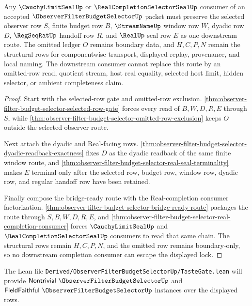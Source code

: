 \begin{theorem}
\label{thm:observer-filter-budget-selector-downstream-budget-lock}
Any $\CauchyLimitSealUp$ or $\RealCompletionSelectorSealUp$ consumer of an accepted $\ObserverFilterBudgetSelectorUp$ packet must preserve the selected observer row $S$, finite budget row $B$, $\StreamNameUp$ window row $W$, dyadic row $D$, $\RegSeqRatUp$ handoff row $R$, and $\RealUp$ seal row $E$ as one downstream route. The omitted ledger $O$ remains boundary data, and $H,C,P,N$ remain the structural rows for componentwise transport, displayed replay, provenance, and local naming. The downstream consumer cannot replace this route by an omitted-row read, quotient stream, host real equality, selected host limit, hidden selector, or ambient completeness claim.
\end{theorem}
\begin{proof}
Start with the selected-row gate and omitted-row exclusion. \autoref{thm:observer-filter-budget-selector-selected-row-gate} forces every read of $B,W,D,R,E$ through $S$, while \autoref{thm:observer-filter-budget-selector-omitted-row-exclusion} keeps $O$ outside the selected observer route.

Next attach the dyadic and Real-facing rows. \autoref{thm:observer-filter-budget-selector-dyadic-readback-exactness} fixes $D$ as the dyadic readback of the same finite window route, and \autoref{thm:observer-filter-budget-selector-real-seal-terminality} makes $E$ terminal only after the selected row, budget row, window row, dyadic row, and regular handoff row have been retained.

Finally compose the bridge-ready route with the Real-completion consumer factorization. \autoref{thm:observer-filter-budget-selector-bridge-ready-route} packages the route through $S,B,W,D,R,E$, and \autoref{thm:observer-filter-budget-selector-real-completion-consumer} forces $\CauchyLimitSealUp$ and $\RealCompletionSelectorSealUp$ consumers to read that same chain. The structural rows remain $H,C,P,N$, and the omitted row remains boundary-only, so no downstream completion consumer can escape the displayed lock.
\end{proof}

The Lean file \texttt{Derived/ObserverFilterBudgetSelectorUp/TasteGate.lean} will provide $\mathsf{Nontrivial}\ \ObserverFilterBudgetSelectorUp$ and $\mathsf{FieldFaithful}\ \ObserverFilterBudgetSelectorUp$ instances over the displayed rows.

